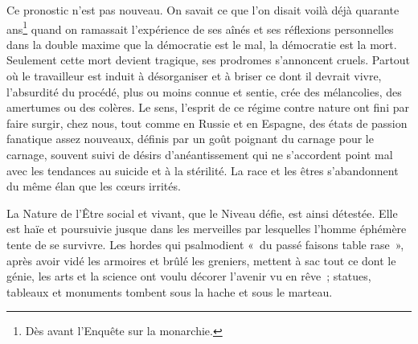 \documentclass[french,twoside]{book} %
\begin{document}
Ce pronostic n’est pas nouveau. On savait ce que l’on disait voilà déjà quarante ans\footnote{Dès avant l’Enquête sur la monarchie.} quand on ramassait l’expérience de ses aînés et ses réflexions personnelles dans la double maxime que la démocratie est le mal, la démocratie est la mort. Seulement cette mort devient tragique, ses prodromes s’annoncent cruels. Partout où le travailleur est induit à désorganiser et à briser ce dont il devrait vivre, l’absurdité du procédé, plus ou moins connue et sentie, crée des mélancolies, des amertumes ou des colères. Le sens, l’esprit de ce régime contre nature ont fini par faire surgir, chez nous, tout comme en Russie et en Espagne, des états de passion fanatique assez nouveaux, définis par un goût poignant du carnage pour le carnage, souvent suivi de désirs d’anéantissement qui ne s’accordent point mal avec les tendances au suicide et à la stérilité. La race et les êtres s’abandonnent du même élan que les cœurs irrités.\par
La Nature de l’Être social et vivant, que le Niveau défie, est ainsi détestée. Elle est haïe et poursuivie jusque dans les merveilles par lesquelles l’homme éphémère tente de se survivre. Les hordes qui psalmodient « du passé faisons table rase », après avoir vidé les armoires et brûlé les greniers, mettent à sac tout ce dont le génie, les arts et la science ont voulu décorer l’avenir vu en rêve ; statues, tableaux et monuments tombent sous la hache et sous le marteau.\par
\end{document}
